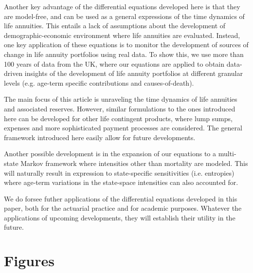 \documentclass[12pt]{article}
\begin{document}
 Another key advantage of the differential equations developed here is that they are model-free, and can be used as a general expressions of the time dynamics of life annuities. This entails a lack of assumptions about the development of demographic-economic environment where life annuities are evaluated. Instead, one key application of these equations is to monitor the development of sources of change in life annuity portfolios using real data. To show this, we use more than 100 years of data from the UK, where our equations are applied to obtain data-driven insights of the development of life annuity portfolios at different granular levels (e.g. age-term specific contributions and causes-of-death).
  
  
The main focus of this article is unraveling the time dynamics of life annuities and associated reserves. However, similar formulations to the ones introduced here can be developed for other life contingent products, where lump sumps, expenses and more sophisticated payment processes are considered. The general framework introduced here easily allow for future developments. 

Another possible development is in the expansion of our equations to a multi-state Markov framework where intensities other than mortality are modeled. This will naturally result in expression to state-specific sensitivities (i.e. entropies) where age-term variations in the state-space intensities can also accounted for.

We do forsee futher applications of the differential equations developed in this paper, both for the actuarial practice and for academic purposes. Whatever the applications of upcoming developments, they will establish their utility in the future.




\newpage


%
%



\newpage

\FloatBarrier
\section{Figures}
\end{document}
